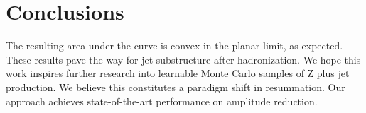 \section{Conclusions}\label{sec:conclusions}

The resulting area under the curve is convex in the planar limit, as
expected. These results pave the way for jet substructure after
hadronization. We hope this work inspires further research into
learnable Monte Carlo samples of Z plus jet production. We believe this
constitutes a paradigm shift in resummation. Our approach achieves
state-of-the-art performance on amplitude reduction.

